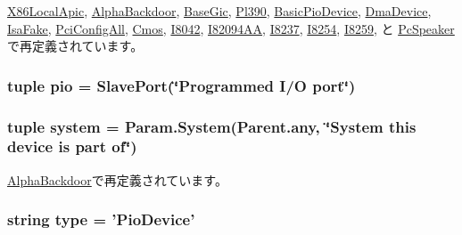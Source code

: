 \hyperlink{classX86LocalApic_1_1X86LocalApic_a17da7064bc5c518791f0c891eff05fda}{X86LocalApic}, \hyperlink{classAlphaBackdoor_1_1AlphaBackdoor_a17da7064bc5c518791f0c891eff05fda}{AlphaBackdoor}, \hyperlink{classGic_1_1BaseGic_a17da7064bc5c518791f0c891eff05fda}{BaseGic}, \hyperlink{classGic_1_1Pl390_a17da7064bc5c518791f0c891eff05fda}{Pl390}, \hyperlink{classDevice_1_1BasicPioDevice_a17da7064bc5c518791f0c891eff05fda}{BasicPioDevice}, \hyperlink{classDevice_1_1DmaDevice_a17da7064bc5c518791f0c891eff05fda}{DmaDevice}, \hyperlink{classDevice_1_1IsaFake_a17da7064bc5c518791f0c891eff05fda}{IsaFake}, \hyperlink{classPci_1_1PciConfigAll_a17da7064bc5c518791f0c891eff05fda}{PciConfigAll}, \hyperlink{classCmos_1_1Cmos_a17da7064bc5c518791f0c891eff05fda}{Cmos}, \hyperlink{classI8042_1_1I8042_a17da7064bc5c518791f0c891eff05fda}{I8042}, \hyperlink{classI82094AA_1_1I82094AA_a17da7064bc5c518791f0c891eff05fda}{I82094AA}, \hyperlink{classI8237_1_1I8237_a17da7064bc5c518791f0c891eff05fda}{I8237}, \hyperlink{classI8254_1_1I8254_a17da7064bc5c518791f0c891eff05fda}{I8254}, \hyperlink{classI8259_1_1I8259_a17da7064bc5c518791f0c891eff05fda}{I8259}, と \hyperlink{classPcSpeaker_1_1PcSpeaker_a17da7064bc5c518791f0c891eff05fda}{PcSpeaker}で再定義されています。\hypertarget{classDevice_1_1PioDevice_a4b2bf1690cc3261b071d85c69ddcbcdc}{
\subsubsection[{pio}]{\setlength{\rightskip}{0pt plus 5cm}tuple {\bf pio} = {\bf SlavePort}(\char`\"{}Programmed I/O port\char`\"{})}}
\label{classDevice_1_1PioDevice_a4b2bf1690cc3261b071d85c69ddcbcdc}
\hypertarget{classDevice_1_1PioDevice_ab737471139f5a296e5b26e8a0e1b0744}{
\subsubsection[{system}]{\setlength{\rightskip}{0pt plus 5cm}tuple {\bf system} = Param.System(Parent.any, \char`\"{}System this device is part of\char`\"{})}}
\label{classDevice_1_1PioDevice_ab737471139f5a296e5b26e8a0e1b0744}


\hyperlink{classAlphaBackdoor_1_1AlphaBackdoor_ab737471139f5a296e5b26e8a0e1b0744}{AlphaBackdoor}で再定義されています。\hypertarget{classDevice_1_1PioDevice_acce15679d830831b0bbe8ebc2a60b2ca}{
\subsubsection[{type}]{\setlength{\rightskip}{0pt plus 5cm}string {\bf type} = '{\bf PioDevice}'}}
\label{classDevice_1_1PioDevice_acce15679d830831b0bbe8ebc2a60b2ca}


